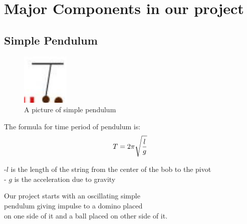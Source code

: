 \section{Major Components in our project}

\subsection{Simple Pendulum}
\begin{figure}
	\caption{A picture of simple pendulum}
	\begin{center}
	 \includegraphics[width=0.2\textwidth]{pendulum.jpg}%
	 \end{center}
	
\end{figure}

\begin{frame}
\centering

The formula for time period of pendulum is:
\begin{equation}
\\
\\
	T = 2\pi \sqrt {\frac{l}{g}}
	\\
	\\
\end{equation}
\begin{flushleft}
 -$ l $ is the length of the string from the center of the bob to the pivot\\ 
- $ g $ is the acceleration due to gravity\\
\end{flushleft}
Our project starts with an oscillating simple\\ pendulum giving impulse to a domino placed\\ on one side of it and a ball placed on other side of it.
\end{frame}
\\
\\
\\
\\
\\
